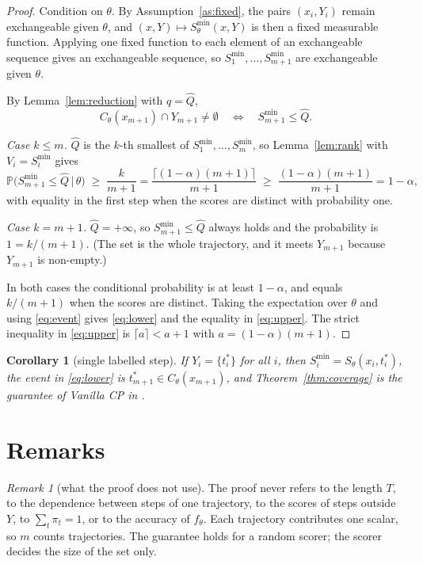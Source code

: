 \documentclass[10pt,a4paper]{article}
\newtheorem{corollary}{Corollary}
\theoremstyle{definition}
\theoremstyle{remark}
\newtheorem{remark}{Remark}
\newcommand{\Prob}{\mathbb{P}}
\newcommand{\C}{C}
\newcommand{\Qhat}{\widehat Q}
\newcommand{\Smin}{S^{\min}}
\begin{document}
\begin{proof}
Condition on $\theta$. By Assumption~\ref{as:fixed}, the pairs $(x_i,Y_i)$ remain exchangeable given $\theta$, and $(x,Y)\mapsto\Smin_\theta(x,Y)$ is then a fixed measurable function. Applying one fixed function to each element of an exchangeable sequence gives an exchangeable sequence, so $\Smin_1,\dots,\Smin_{m+1}$ are exchangeable given $\theta$.

By Lemma~\ref{lem:reduction} with $q=\Qhat$,
\begin{equation}
\C_\theta(x_{m+1})\cap Y_{m+1}\neq\emptyset\quad\Longleftrightarrow\quad\Smin_{m+1}\le\Qhat . \label{eq:event}
\end{equation}

\emph{Case $k\le m$.} $\Qhat$ is the $k$-th smallest of $\Smin_1,\dots,\Smin_m$, so Lemma~\ref{lem:rank} with $V_i=\Smin_i$ gives
\[
\Prob\big(\Smin_{m+1}\le\Qhat\,\big|\,\theta\big)\;\ge\;\frac{k}{m+1}=\frac{\lceil(1-\alpha)(m+1)\rceil}{m+1}\;\ge\;\frac{(1-\alpha)(m+1)}{m+1}=1-\alpha ,
\]
with equality in the first step when the scores are distinct with probability one.

\emph{Case $k=m+1$.} $\Qhat=+\infty$, so $\Smin_{m+1}\le\Qhat$ always holds and the probability is $1=k/(m+1)$. (The set is the whole trajectory, and it meets $Y_{m+1}$ because $Y_{m+1}$ is non-empty.)

In both cases the conditional probability is at least $1-\alpha$, and equals $k/(m+1)$ when the scores are distinct. Taking the expectation over $\theta$ and using \eqref{eq:event} gives \eqref{eq:lower} and the equality in \eqref{eq:upper}. The strict inequality in \eqref{eq:upper} is $\lceil a\rceil<a+1$ with $a=(1-\alpha)(m+1)$.
\end{proof}

\begin{corollary}[single labelled step] \label{cor:single}
If $Y_i=\{t_i^{*}\}$ for all $i$, then $\Smin_i=S_\theta(x_i,t_i^{*})$, the event in \eqref{eq:lower} is $t^{*}_{m+1}\in\C_\theta(x_{m+1})$, and Theorem~\ref{thm:coverage} is the guarantee of Vanilla CP in \cite{feng2026conformal}.
\end{corollary}

\section{Remarks}

\begin{remark}[what the proof does not use]
The proof never refers to the length $T$, to the dependence between steps of one trajectory, to the scores of steps outside $Y$, to $\sum_t\pi_t=1$, or to the accuracy of $f_\theta$. Each trajectory contributes one scalar, so $m$ counts trajectories. The guarantee holds for a random scorer; the scorer decides the size of the set only.
\end{remark}
\end{document}
